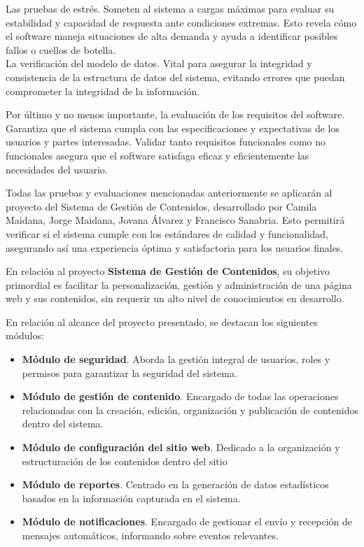 \documentclass[10pt,times,twocolumn]{article}
\begin{document}
Las pruebas de estrés. Someten al sistema a cargas máximas para evaluar su estabilidad y capacidad de respuesta ante condiciones extremas. Esto revela cómo el software maneja situaciones de alta demanda y ayuda a identificar posibles fallos o cuellos de botella.\\

La verificación del modelo de datos. Vital para asegurar la integridad y consistencia de la estructura de datos del sistema, evitando errores que puedan comprometer la integridad de la información.

Por último y no menos importante, la evaluación de los requisitos del software. Garantiza que el sistema cumpla con las especificaciones y expectativas de los usuarios y partes interesadas. Validar tanto requisitos funcionales como no funcionales asegura que el software satisfaga eficaz y eficientemente las necesidades del usuario.

Todas las pruebas y evaluaciones mencionadas anteriormente se aplicarán al proyecto del Sistema de Gestión de Contenidos, desarrollado por Camila Maidana, Jorge Maidana, Jovana Álvarez y Francisco Sanabria. Esto permitirá verificar si el sistema cumple con los estándares de calidad y funcionalidad, asegurando así una experiencia óptima y satisfactoria para los usuarios finales.

En relación al proyecto \textbf{Sistema de Gestión de Contenidos}, su objetivo primordial es facilitar la personalización, gestión y administración de una página web y sus contenidos, sin requerir un alto nivel de conocimientos en desarrollo.

En relación al alcance del proyecto presentado, se destacan los siguientes módulos:

\begin{itemize}
	\item \textbf{Módulo de seguridad}. Aborda la gestión integral de usuarios, roles y permisos para garantizar la seguridad del sistema.
	\item \textbf{Módulo de gestión de contenido}. Encargado de todas las operaciones relacionadas con la creación, edición, organización y publicación de contenidos dentro del sistema.
	\item \textbf{Módulo de configuración del sitio web}. Dedicado a la organización y estructuración de los contenidos dentro del sitio
	\item \textbf{Módulo de reportes}. Centrado en la generación de datos estadísticos basados en la información capturada en el sistema.
	\item \textbf{Módulo de notificaciones}. Encargado de gestionar el envío y recepción de mensajes automáticos, informando sobre eventos relevantes.
\end{itemize}
\end{document}
